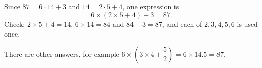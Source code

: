 Since $87=6\cdot14+3$ and $14=2\cdot5+4$, one expression is
\[
\boxed{6\times(2\times5+4)+3=87}.
\]
Check: $2\times5+4=14$, $6\times14=84$ and $84+3=87$, and each of $2,3,4,5,6$ is used once.

There are other answers, for example $6\times\left(3\times4+\dfrac{5}{2}\right)=6\times14.5=87$.
